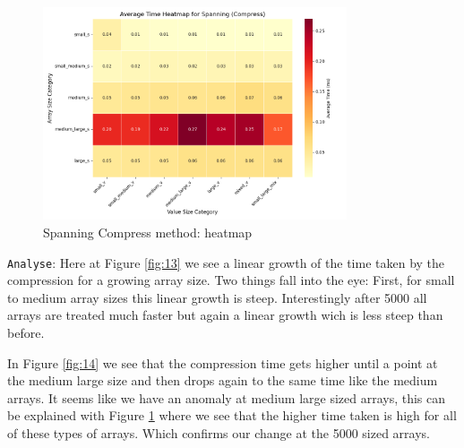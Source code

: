 \documentclass[11pt, a4paper]{article}
\begin{document}
	\begin{figure}[H]%
		\centering
		\includegraphics[width=0.8\textwidth]{Grafics/Spanning/SpanningCompressHeat.png}
		\caption{Spanning Compress method: heatmap}
		\label{fig:15}
	\end{figure}
	\texttt{Analyse}: Here at Figure \ref{fig:13} we see a linear growth of the time taken by the compression for a growing array size. Two things fall into the eye: First, for small to medium array sizes this linear growth is steep. Interestingly after 5000 all arrays are treated much faster but again a linear growth wich is less steep than before. 
	
	In Figure \ref{fig:14} we see that the compression time gets higher until a point at the medium large size and then drops again to the same time like the medium arrays. It seems like we have an anomaly at medium large sized arrays, this can be explained with Figure \ref{fig:15} where we see that the higher time taken is high for all of these types of arrays. Which confirms our change at the 5000 sized arrays. 
	\par %
	
	
\end{document}
